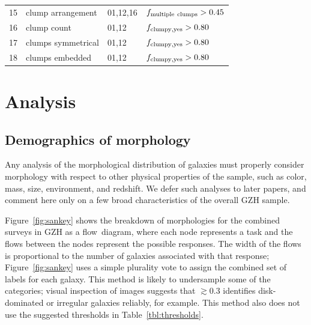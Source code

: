\documentclass[twocolumn]{aastex6}
\begin{document}
\begin{table}
\begin{tabular}{llll}
15       & clump arrangement    & 01,12,16         & $f_{\rm multiple~clumps}>0.45$     \\
16       & clump count          & 01,12            & $f_{\rm clumpy,yes}>0.80$          \\
17       & clumps symmetrical   & 01,12            & $f_{\rm clumpy,yes}>0.80$          \\
18       & clumps embedded      & 01,12            & $f_{\rm clumpy,yes}>0.80$          \\
\hline\hline
\end{tabular}
\end{table}

\section{Analysis}\label{sec:analysis}


\subsection{Demographics of morphology}

Any analysis of the morphological distribution of galaxies must properly consider morphology with respect to other physical properties of the sample, such as color, mass, size, environment, and redshift. We defer such analyses to later papers, and comment here only on a few broad characteristics of the overall GZH sample. 

Figure~\ref{fig:sankey} shows the breakdown of morphologies for the combined surveys in GZH as a flow~diagram, where each node represents a task and the flows between the nodes represent the possible responses. The width of the flows is proportional to the number of galaxies associated with that response; Figure~\ref{fig:sankey} uses a simple plurality vote to assign the combined set of labels for each galaxy. This method is likely to undersample some of the categories; visual inspection of images suggests that \ffeatures$\gtrsim0.3$ identifies disk-dominated or irregular galaxies reliably, for example. This method also does not use the suggested thresholds in Table~\ref{tbl:thresholds}. 
\end{document}

